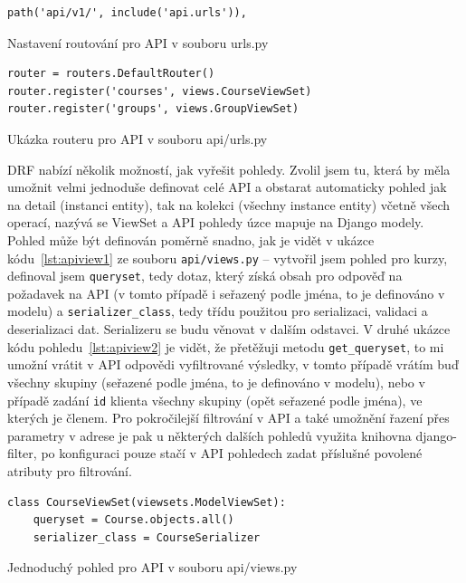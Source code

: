     \begin{listing}[ht]
    	\begin{verbatim}
path('api/v1/', include('api.urls')),
    	\end{verbatim}
    	\caption{Nastavení routování pro API v souboru urls.py}\label{lst:urls.py2}
    \end{listing}
    
    \begin{listing}[ht]
    	\begin{verbatim}
router = routers.DefaultRouter()
router.register('courses', views.CourseViewSet)
router.register('groups', views.GroupViewSet)
    	\end{verbatim}
    	\caption{Ukázka routeru pro API v souboru api/urls.py}\label{lst:apirouter}
    \end{listing}
    
    DRF nabízí několik možností, jak vyřešit pohledy. Zvolil jsem tu, která by měla umožnit velmi jednoduše definovat celé API a obstarat automaticky pohled jak na detail (instanci entity), tak na kolekci (všechny instance entity) včetně všech operací, nazývá se ViewSet a API pohledy úzce mapuje na Django modely. Pohled může být definován poměrně snadno, jak je vidět v ukázce kódu~\ref{lst:apiview1} ze souboru \verb|api/views.py| -- vytvořil jsem pohled pro kurzy, definoval jsem \verb|queryset|, tedy dotaz, který získá obsah pro odpověď na požadavek na API (v tomto případě i seřazený podle jména, to je definováno v modelu) a \verb|serializer_class|, tedy třídu použitou pro serializaci, validaci a deserializaci dat. Serializeru se budu věnovat v dalším odstavci. V druhé ukázce kódu pohledu~\ref{lst:apiview2} je vidět, že přetěžuji metodu \verb|get_queryset|, to mi umožní vrátit v API odpovědi vyfiltrované výsledky, v tomto případě vrátím buď všechny skupiny (seřazené podle jména, to je definováno v modelu), nebo v případě zadání \verb|id| klienta všechny skupiny (opět seřazené podle jména), ve kterých je členem. Pro pokročilejší filtrování v API a také umožnění řazení přes parametry v adrese je pak u některých dalších pohledů využita knihovna django-filter, po konfiguraci pouze stačí v API pohledech zadat příslušné povolené atributy pro filtrování.
    
    \begin{listing}[ht]
    	\begin{verbatim}
class CourseViewSet(viewsets.ModelViewSet):
    queryset = Course.objects.all()
    serializer_class = CourseSerializer
    	\end{verbatim}
    	\caption{Jednoduchý pohled pro API v souboru api/views.py}\label{lst:apiview1}
    \end{listing}
    

